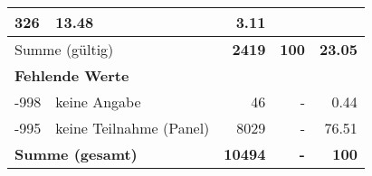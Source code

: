 \begin{longtable}{lXrrr}
       \num{326} &
       \num[round-mode=places,round-precision=2]{13.48} &
         \num[round-mode=places,round-precision=2]{3.11} \\
     \midrule
     \multicolumn{2}{l}{Summe (gültig)} &
       \textbf{\num{2419}} &
     \textbf{\num{100}} &
       \textbf{\num[round-mode=places,round-precision=2]{23.05}} \\
     \multicolumn{5}{l}{\textbf{Fehlende Werte}}\\
       -998 &
       keine Angabe &
         \num{46} &
        - &
         \num[round-mode=places,round-precision=2]{0.44} \\
       -995 &
       keine Teilnahme (Panel) &
         \num{8029} &
        - &
         \num[round-mode=places,round-precision=2]{76.51} \\
     \midrule
     \multicolumn{2}{l}{\textbf{Summe (gesamt)}} &
          \textbf{\num{10494}} &
        \textbf{-} &
        \textbf{\num{100}} \\
     \bottomrule
     \end{longtable}
     
